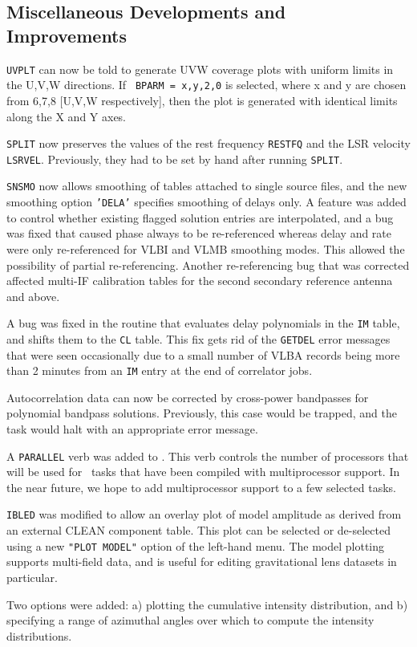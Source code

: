 \subsection{Miscellaneous Developments and Improvements}

\begin{description}

 {\tt UVPLT} can now be told to generate UVW
coverage plots with uniform limits in the U,V,W directions.  If {\tt
BPARM = x,y,2,0} is selected, where x and y are chosen from 6,7,8
[U,V,W respectively], then the plot is generated with identical limits
along the X and Y axes.

 {\tt SPLIT} now preserves the values of the rest
frequency {\tt RESTFQ} and the LSR velocity {\tt LSRVEL}.  Previously,
they had to be set by hand after running {\tt SPLIT}.

 {\tt SNSMO} now allows smoothing of tables attached
to single source files, and the new smoothing option {\tt 'DELA'}
specifies smoothing of delays only.  A feature was added to control
whether existing flagged solution entries are interpolated, and a bug
was fixed that caused phase always to be re-referenced whereas delay
and rate were only re-referenced for VLBI and VLMB smoothing
modes. This allowed the possibility of partial re-referencing.
Another re-referencing bug that was corrected affected multi-IF
calibration tables for the second secondary reference antenna and
above.

 A bug was fixed in the routine that evaluates delay
polynomials in the {\tt IM} table, and shifts them to the {\tt CL}
table. This fix gets rid of the {\tt GETDEL} error messages that were
seen occasionally due to a small number of VLBA records being more
than 2 minutes from an {\tt IM} entry at the end of correlator jobs.

 \hskip 0.5cm Autocorrelation data can now be
corrected by cross-power bandpasses for polynomial bandpass solutions.
Previously, this case would be trapped, and the task would halt with
an appropriate error message.


 A {\tt PARALLEL} verb was added to \AIPS.  This
verb controls the number of processors that will be used for \AIPS\
tasks that have been compiled with multiprocessor support.  In the
near future, we hope to add multiprocessor support to a few selected
tasks.

 {\tt IBLED} was modified to allow an overlay plot
of model amplitude as derived from an external CLEAN component
table. This plot can be selected or de-selected using a new {\tt "PLOT
MODEL"} option of the left-hand menu. The model plotting supports
multi-field data, and is useful for editing gravitational lens
datasets in particular.

 Two options were added: a) plotting the cumulative
intensity distribution, and b) specifying a range of azimuthal angles
over which to compute the intensity distributions.

\end{description}
\vskip -10pt %

